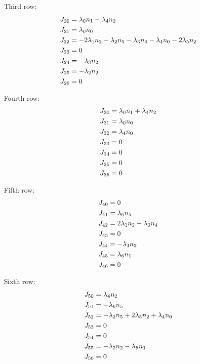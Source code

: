 \documentclass[a4paper, 12pt]{article}
\begin{document}
Third row:
\begin{equation*}
    \centering
    \begin{split}
        J_{20} &= \lambda_0n_1 - \lambda_4n_2\\
        J_{21} &= \lambda_0n_0\\
        J_{22} &= -2\lambda_1n_2 -\lambda_2n_5 - \lambda_3n_4 - \lambda_4n_0 - 2\lambda_5n_2\\
        J_{23} &= 0\\
        J_{24} &= -\lambda_3n_2\\
        J_{25} &= -\lambda_2n_2\\
        J_{26} &= 0
    \end{split}
\end{equation*}

Fourth row:
\begin{equation*}
    \centering
    \begin{split}
       J_{30} &= \lambda_0n_1 + \lambda_4n_2\\
       J_{31} &= \lambda_0n_0\\
       J_{32} &= \lambda_4n_0\\
       J_{33} &= 0\\
       J_{34} &= 0\\
       J_{35} &= 0\\
       J_{36} &= 0
    \end{split}
\end{equation*}

Fifth row:
\begin{equation*}
    \centering
    \begin{split}
       J_{40} &= 0\\
       J_{41} &= \lambda_6n_5\\
       J_{42} &= 2\lambda_1n_2 - \lambda_3n_4\\
       J_{43} &= 0\\
       J_{44} &= -\lambda_3n_2\\
       J_{45} &= \lambda_6n_1\\
       J_{46} &= 0
    \end{split}
\end{equation*}

Sixth row:
\begin{equation*}
    \centering
    \begin{split}
        J_{50} &= \lambda_4n_2\\
        J_{51} &= -\lambda_6n_5\\
        J_{52} &= -\lambda_2n_5 + 2\lambda_5n_2 + \lambda_4n_0\\
        J_{53} &= 0\\
        J_{54} &= 0\\
        J_{55} &= -\lambda_2n_2 - \lambda_6n_1\\
        J_{56} &= 0
    \end{split}
\end{equation*}
\end{document}
